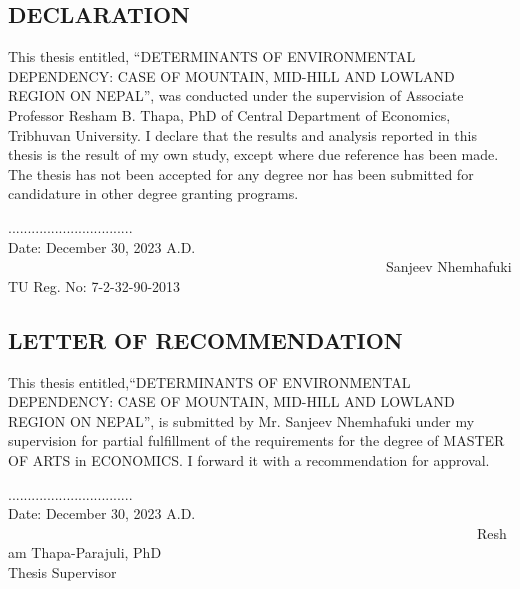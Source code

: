 \documentclass[12pt]{report}
\begin{document}
\newpage %
\begin{center}
\section*{DECLARATION}
\end{center}
\renewcommand{\thepage}{\roman{page}}
\setcounter{page}{1}
This thesis entitled, “DETERMINANTS OF ENVIRONMENTAL DEPENDENCY: CASE OF MOUNTAIN, MID-HILL AND LOWLAND REGION ON NEPAL”, was conducted under the supervision of Associate Professor Resham B. Thapa, PhD of Central Department of Economics, Tribhuvan University. I declare that the results and analysis reported in this thesis is the result of my own study, except where due reference has been made. The thesis has not been accepted for any degree nor has been submitted for candidature in other degree granting programs.

\vspace{2cm}

\begin{flushright}
    ................................\\
    Date: December 30, 2023 A.D. \ \ \ \ \ \ \ \ \ \ \ \ \ \ \ \ \ \ \ \ \ \ \ \ \ \ \ \ \ \  \ \ \ \ \ \ \ \ \ \ \ \ \ \ \ \ \ \ \ \ \ \ \ \  Sanjeev Nhemhafuki\\
    TU Reg. No: 7-2-32-90-2013
\end{flushright}

\newpage %
\begin{center}
\section*{LETTER OF RECOMMENDATION}
\end{center}
\renewcommand{\thepage}{\roman{page}}
\setcounter{page}{2}
This thesis entitled,“DETERMINANTS OF ENVIRONMENTAL DEPENDENCY: CASE OF MOUNTAIN, MID-HILL AND LOWLAND REGION ON NEPAL”, is submitted by Mr. Sanjeev Nhemhafuki under my supervision for partial fulfillment of the requirements for the degree of MASTER OF ARTS in ECONOMICS. I forward it with a recommendation for approval.

\vspace{2cm}

\begin{flushright}
    ................................\\
    Date: December 30, 2023 A.D. \ \ \ \ \ \ \ \ \ \ \ \ \ \ \ \ \ \ \ \ \ \ \ \ \ \ \ \ \ \ \ \ \ \ \ \ \ \ \ \ \ \ \  \ \ \ \ \ \ \ \ \ \ \ \ \ \ \ \ \ \ \ \ \ \ \ \  Resham Thapa-Parajuli, PhD\\
    Thesis Supervisor
\end{flushright}
\end{document}
